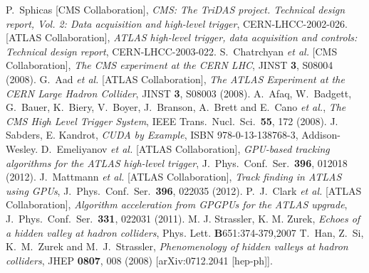 \documentclass{JINST}
\begin{document}
\begin{thebibliography}{9}

%
  P.~Sphicas [CMS Collaboration],
\emph{CMS: The TriDAS project. Technical design report, Vol. 2: Data acquisition and high-level trigger},
  CERN-LHCC-2002-026.
%
%
  [ATLAS Collaboration],
\emph{ATLAS high-level trigger, data acquisition and controls: Technical design report},
  CERN-LHCC-2003-022.
%
%
  S.~Chatrchyan {\it et al.}  [CMS Collaboration],
\emph{The CMS experiment at the CERN LHC},
  JINST {\bf 3}, S08004 (2008).
%
%
  G.~Aad {\it et al.}  [ATLAS Collaboration],
\emph{The ATLAS Experiment at the CERN Large Hadron Collider},
  JINST {\bf 3}, S08003 (2008).
%
%
  A.~Afaq, W.~Badgett, G.~Bauer, K.~Biery, V.~Boyer, J.~Branson, A.~Brett and E.~Cano {\it et al.},
  \emph{The CMS High Level Trigger System},
  IEEE Trans.\ Nucl.\ Sci.\  {\bf 55}, 172 (2008).
%
J. Sabders, E. Kandrot,
\emph{CUDA by Example},
ISBN 978-0-13-138768-3, Addison-Wesley.
%
%
  D.~Emeliyanov {\it et al.}  [ATLAS Collaboration],
  \emph{GPU-based tracking algorithms for the ATLAS high-level trigger},
  J.\ Phys.\ Conf.\ Ser.\  {\bf 396}, 012018 (2012).
  J.~Mattmann {\it et al.}  [ATLAS Collaboration],
  \emph{Track finding in ATLAS using GPUs},
  J.\ Phys.\ Conf.\ Ser.\  {\bf 396}, 022035 (2012).
  P.~J.~Clark {\it et al.}  [ATLAS Collaboration],
  \emph{Algorithm acceleration from GPGPUs for the ATLAS upgrade},
  J.\ Phys.\ Conf.\ Ser.\  {\bf 331}, 022031 (2011).
%
%
M. J. Strassler, K. M. Zurek, 
\emph{Echoes of a hidden valley at hadron colliders},
Phys. Lett. \textbf{B}651:374-379,2007 
%
  T.~Han, Z.~Si, K.~M.~Zurek and M.~J.~Strassler,
  \emph{Phenomenology of hidden valleys at hadron colliders},
  JHEP {\bf 0807}, 008 (2008)
  [arXiv:0712.2041 [hep-ph]].

\end{thebibliography}
\end{document}
